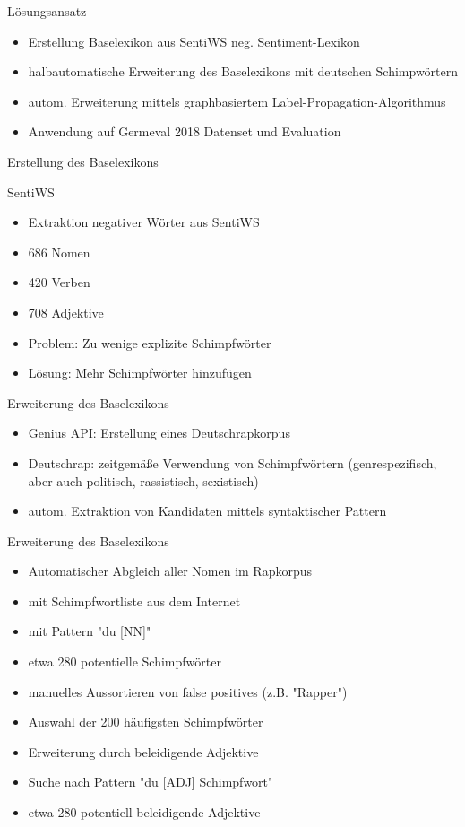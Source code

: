\documentclass{beamer}
\begin{document}
\begin{frame}{Lösungsansatz}
\begin{itemize}
\item Erstellung Baselexikon aus SentiWS neg. Sentiment-Lexikon
\item halbautomatische Erweiterung des Baselexikons mit deutschen Schimpwörtern
\item autom. Erweiterung mittels graphbasiertem Label-Propagation-Algorithmus
\item Anwendung auf Germeval 2018 Datenset und Evaluation
\end{itemize}
\end{frame}

\begin{frame}{Erstellung des Baselexikons}
\begin{block}{SentiWS}
	\begin{itemize}
		\item Extraktion negativer Wörter aus SentiWS
		\item 686 Nomen
		\item 420 Verben
		\item 708 Adjektive
		\item Problem: Zu wenige explizite Schimpfwörter
		\item Lösung: Mehr Schimpfwörter hinzufügen
	\end{itemize}
\end{block}
\end{frame}

\begin{frame}{Erweiterung des Baselexikons}
\begin{itemize}
\item Genius API: Erstellung eines Deutschrapkorpus 
\item Deutschrap: zeitgemäße Verwendung von Schimpfwörtern (genrespezifisch, aber auch politisch, rassistisch, sexistisch)
\item autom. Extraktion von Kandidaten mittels syntaktischer Pattern
\end{itemize}
\end{frame}

\begin{frame}{Erweiterung des Baselexikons}
	\begin{itemize}
		\item Automatischer Abgleich aller Nomen im Rapkorpus
		\item mit Schimpfwortliste aus dem Internet
		\item mit Pattern "du [NN]"
		\item etwa 280 potentielle Schimpfwörter
		\item manuelles Aussortieren von false positives (z.B. "Rapper")
		\item Auswahl der 200 häufigsten Schimpfwörter
		\item Erweiterung durch beleidigende Adjektive
		\item Suche nach Pattern "du [ADJ] Schimpfwort"
		\item etwa 280 potentiell beleidigende Adjektive
	\end{itemize}
\end{frame}
\end{document}
